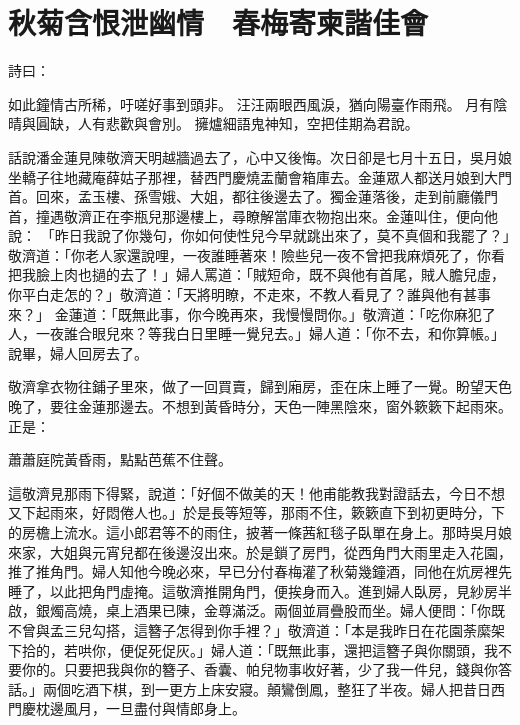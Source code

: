 %

\chapter{秋菊含恨泄幽情　春梅寄柬諧佳會}

詩曰：

如此鐘情古所稀，吁嗟好事到頭非。
汪汪兩眼西風淚，猶向陽臺作雨飛。
月有陰晴與圓缺，人有悲歡與會別。
擁爐細語鬼神知，空把佳期為君說。

話說潘金蓮見陳敬濟天明越牆過去了，心中又後悔。次日卻是七月十五日，吳月娘坐轎子往地藏庵薛姑子那裡，替西門慶燒盂蘭會箱庫去。金蓮眾人都送月娘到大門首。回來，孟玉樓、孫雪娥、大姐，都往後邊去了。獨金蓮落後，走到前廳儀門首，撞遇敬濟正在李瓶兒那邊樓上，尋瞭解當庫衣物抱出來。金蓮叫住，便向他說： 「昨日我說了你幾句，你如何使性兒今早就跳出來了，莫不真個和我罷了？」敬濟道：「你老人家還說哩，一夜誰睡著來！險些兒一夜不曾把我麻煩死了，你看把我臉上肉也撾的去了！」婦人罵道：「賊短命，既不與他有首尾，賊人膽兒虛，你平白走怎的？」敬濟道：「天將明瞭，不走來，不教人看見了？誰與他有甚事來？」 金蓮道：「既無此事，你今晚再來，我慢慢問你。」敬濟道：「吃你麻犯了人，一夜誰合眼兒來？等我白日里睡一覺兒去。」婦人道：「你不去，和你算帳。」說畢，婦人回房去了。

敬濟拿衣物往鋪子里來，做了一回買賣，歸到廂房，歪在床上睡了一覺。盼望天色晚了，要往金蓮那邊去。不想到黃昏時分，天色一陣黑陰來，窗外簌簌下起雨來。正是：

蕭蕭庭院黃昏雨，點點芭蕉不住聲。

這敬濟見那雨下得緊，說道：「好個不做美的天！他甫能教我對證話去，今日不想又下起雨來，好悶倦人也。」於是長等短等，那雨不住，簌簌直下到初更時分，下的房檐上流水。這小郎君等不的雨住，披著一條茜紅毯子臥單在身上。那時吳月娘來家，大姐與元宵兒都在後邊沒出來。於是鎖了房門，從西角門大雨里走入花園，推了推角門。婦人知他今晚必來，早已分付春梅灌了秋菊幾鐘酒，同他在炕房裡先睡了，以此把角門虛掩。這敬濟推開角門，便挨身而入。進到婦人臥房，見紗房半啟，銀燭高燒，桌上酒果已陳，金尊滿泛。兩個並肩疊股而坐。婦人便問：「你既不曾與孟三兒勾搭，這簪子怎得到你手裡？」敬濟道：「本是我昨日在花園荼縻架下拾的，若哄你，便促死促灰。」婦人道：「既無此事，還把這簪子與你關頭，我不要你的。只要把我與你的簪子、香囊、帕兒物事收好著，少了我一件兒，錢與你答話。」兩個吃酒下棋，到一更方上床安寢。顛鸞倒鳳，整狂了半夜。婦人把昔日西門慶枕邊風月，一旦盡付與情郎身上。


